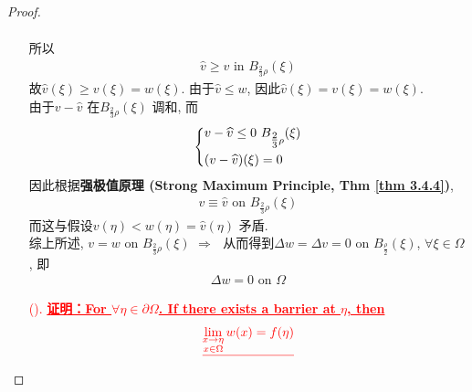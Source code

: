 \begin{thm}
\begin{proof}
\begin{enumerate}
\begin{align*}
				\end{align*}
				所以
				\begin{align*}
					\widehat{v} \geq v \,\, \text{in} \,\, B_{\tfrac{2}{3} \rho}(\xi)
				\end{align*}
				故$\widehat{v}(\xi) \geq v(\xi) = w(\xi)$. 由于$\widehat{v} \leq w$, 因此$\widehat{v}(\xi) = v(\xi) = w(\xi)$. \\
				由于$v - \widehat{v}$ 在$B_{\tfrac{2}{3} \rho}(\xi)$ 调和, 而
				\begin{align*}
					\begin{dcases*}
						v - \widehat{v} \leq 0 \,\, B_{\tfrac{2}{3} \rho}(\xi) \\
						(v - \widehat{v})(\xi) = 0
					\end{dcases*}
				\end{align*}
				因此根据\textbf{强极值原理 (Strong Maximum Principle, Thm \ref{thm 3.4.4})}, 
				\begin{align*}
					v \equiv \widehat{v} \,\, \text{on} \,\, B_{\tfrac{2}{3} \rho}(\xi)
				\end{align*}
				而这与假设$v(\eta) < w(\eta) = \widehat{v}(\eta)$ 矛盾. \\
				综上所述, $v = w$ on $B_{\tfrac{2}{3} \rho}(\xi) \,\, \Rightarrow \,\,$ 从而得到$\Delta w = \Delta v = 0$ on $B_{\tfrac{\rho}{2}}(\xi)$, $\forall \xi \in \Omega$, 即
				\begin{align*}
					\Delta w = 0 \,\, \text{on} \,\, \Omega
				\end{align*}
				
				\newpage
				
				\item[\textcolor{red}{(\rmnum{2}).}] \textcolor{red}{\underline{\textbf{证明：For $\forall \eta \in \partial \Omega$. If there exists a barrier at $\eta$, then}}}
				\begin{align*}
					\textcolor{red}{\underline{\lim_{\substack{x \to \eta \\ x \in \Omega}} w(x) = f(\eta)}}
				\end{align*}
				

\end{enumerate}
\end{proof}
\end{thm}
